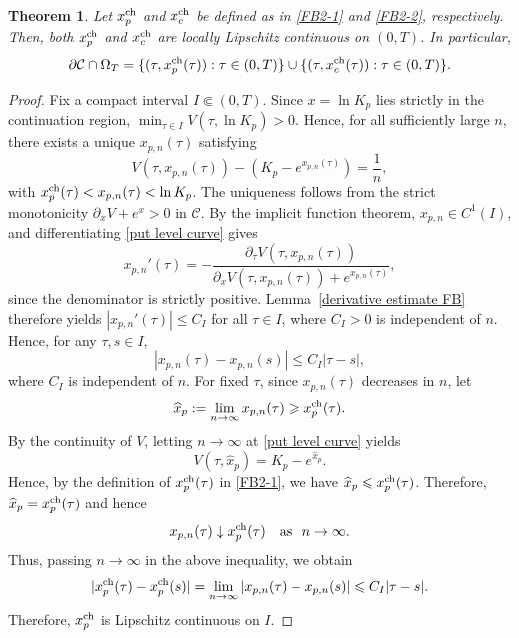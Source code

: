 \documentclass[11pt, a4paper, leqno]{amsart}
\numberwithin{equation}{section}
\theoremstyle{plain}
\newtheorem{theorem}{Theorem}[section]
\theoremstyle{definition}
\theoremstyle{remark}
\def\leq{\leqslant}
\def\geq{\geqslant}
\begin{document}
{
\begin{theorem}\label{Lipschitz free boundary}
Let $x_p^{\rm ch}$ and $x_c^{\rm ch}$ be defined as in
\eqref{FB2-1} and \eqref{FB2-2}, respectively.
Then, both $x_p^{\rm ch}$ and $x_c^{\rm ch}$ are locally Lipschitz
continuous on $(0,T)$.
In particular,
\[
    \partial\mathcal C\cap\Omega_T
    =
    \{(\tau,x_p^{\rm ch}(\tau)):\tau\in(0,T)\}
    \cup
    \{(\tau,x_c^{\rm ch}(\tau)):\tau\in(0,T)\}.
\]
\end{theorem}

\begin{proof}
Fix a compact interval $I\Subset(0,T)$.
Since $x=\ln K_p$ lies strictly in the continuation region,
$\min_{\tau\in I}V(\tau,\ln K_p)>0$.
Hence, for all sufficiently large $n$, there exists a unique
$x_{p,n}(\tau)$ satisfying
\begin{equation}\label{put level curve}
    V(\tau,x_{p,n}(\tau))
    -(K_p-e^{x_{p,n}(\tau)})
    =\frac1n,
\end{equation}
with
$x_p^{\rm ch}(\tau)<x_{p,n}(\tau)<\ln K_p$.
The uniqueness follows from the strict monotonicity
$\partial_xV+e^x>0$ in $\mathcal C$.
By the implicit function theorem,
$x_{p,n}\in C^1(I)$, and differentiating
\eqref{put level curve} gives
\[
    x_{p,n}'(\tau)
    =
    -
    \frac{\partial_\tau V(\tau,x_{p,n}(\tau))}
    {\partial_xV(\tau,x_{p,n}(\tau))
     +e^{x_{p,n}(\tau)}},
\]
since the denominator is strictly positive.
Lemma~\ref{derivative estimate FB} therefore yields
$|x_{p,n}'(\tau)|\leq C_I$ for all $\tau\in I$, where
$C_I>0$ is independent of $n$.
Hence, for any $\tau,s\in I$,
\[
    |x_{p,n}(\tau)-x_{p,n}(s)|
    \leq C_I|\tau-s|,
\]
where $C_I$ is independent of $n$. {
For fixed $\tau$, since $x_{p,n}(\tau)$ decreases in $n$, let
\[
    \widehat x_p:=\lim_{n\to\infty}x_{p,n}(\tau)
    \geq x_p^{\rm ch}(\tau).
\]
By the continuity of $V$, letting $n\to \infty$ at \eqref{put level curve} yields
\[
    V(\tau,\widehat x_p)=K_p-e^{\widehat x_p}.
\]
Hence, by the definition of $x_p^{\rm ch}(\tau)$ in
\eqref{FB2-1}, we have $\widehat x_p\leq x_p^{\rm ch}(\tau)$.
Therefore, $\widehat x_p=x_p^{\rm ch}(\tau)$ and hence
\[
    x_{p,n}(\tau)\downarrow x_p^{\rm ch}(\tau)
    \quad \text{as }\ n\to \infty.
\]}
Thus, passing $n\to\infty$ in the above inequality, we obtain
\[
    |x_p^{\rm ch}(\tau)-x_p^{\rm ch}(s)|
    =
    \lim_{n\to\infty}
    |x_{p,n}(\tau)-x_{p,n}(s)|
    \leq C_I|\tau-s|.
\]
Therefore, $x_p^{\rm ch}$ is Lipschitz continuous on $I$.


\end{proof}}
\end{document}
